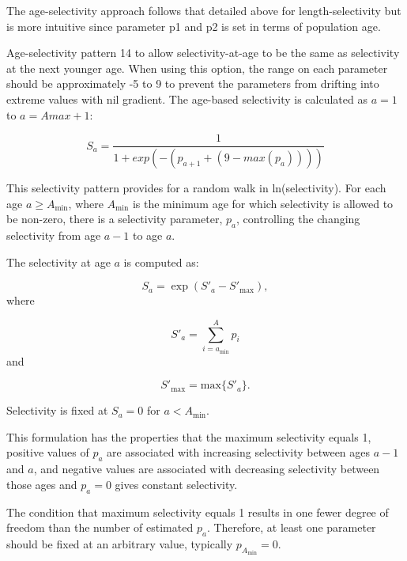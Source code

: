 The age-selectivity approach follows that detailed above for length-selectivity but is more intuitive since parameter p1 and p2 is set in terms of population age. 

Age-selectivity pattern 14 to allow selectivity-at-age to be the same as selectivity at the next younger age.  When using this option, the range on each parameter should be approximately -5 to 9 to prevent the parameters from drifting into extreme values with nil gradient. The age-based selectivity is calculated as $a = 1$ to $a = Amax + 1$:

\begin{equation}
	S_a = \frac{1}{1+exp(-(p_{a+1} + (9 - max(p_a))))}
\end{equation}	

This selectivity pattern provides for a random walk in ln(selectivity).  For each age $a \geq A_{\text{min}}$, where $A_{\text{min}}$ is the minimum age for which selectivity is allowed to be non-zero, there is a selectivity parameter, $p_a$, controlling the changing selectivity from age $a-1$ to age $a$.
	
The selectivity at age $a$ is computed as:

	\begin{equation}
	S_a = \exp (S'_a - S'_{\text{max}}),
	\end{equation}
where

	\begin{equation}
	S'_a = \sum_{i = a_{\text{min}}}^A p_i
	\end{equation}
and
 
	\begin{equation}
	S'_{\text{max}} = \mbox{max} \{S'_a\}.
	\end{equation}

Selectivity is fixed at $S_a = 0$ for $a < A_{\text{min}}$. 
	
This formulation has the properties that the maximum selectivity equals 1, positive values of $p_a$ are associated with increasing selectivity between ages $a-1$ and $a$, and negative values are associated with decreasing selectivity between those ages and $p_a = 0$ gives constant selectivity.
	
The condition that maximum selectivity equals 1 results in one fewer degree of freedom than the number of estimated $p_a$. Therefore, at least one parameter should be fixed at an arbitrary value, typically $p_{A_{\text{min}}}=0$.

